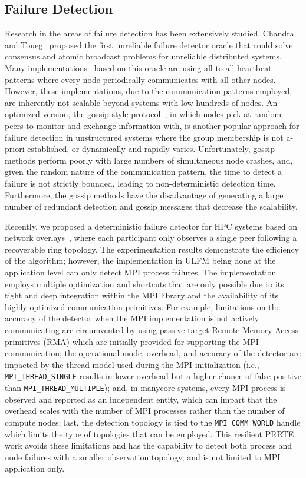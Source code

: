 \documentclass[sigconf]{acmart}
\newcommand{\mpifunc}[1]{\lstinline"MPI_#1"\xspace}
\newcommand{\prrte}[0]{\textsc{PRRTE}\xspace}
\newcommand{\ulfm}[0]{\textsc{ULFM}\xspace}
\newcommand{\mpi}[0]{\textsc{MPI}\xspace}
\begin{document}
\subsection{Failure Detection}
Research in the areas of failure detection has been extensively studied. Chandra and Toueg~\cite{Chandra96} proposed the first unreliable failure detector oracle that could solve consensus and atomic broadcast problems for unreliable distributed systems. Many implementations~\cite{Wei02, Larrea00, Kawazoe97} based on this oracle are using all-to-all heartbeat patterns where every node periodically communicates with all other nodes. However, these implementations, due to the communication patterns employed, are inherently not scalable beyond  systems with low hundreds of nodes. An optimized version, the gossip-style protocol~\cite{van98, Ranganathan01, Gupta01, Abhinandan02}, in which nodes pick at random peers to monitor and exchange information with, is another popular approach for failure detection in unstructured systems where the group membership is not a-priori established, or dynamically and rapidly varies. Unfortunately, gossip methods perform poorly with large numbers of simultaneous node crashes, and, given the random nature of the communication pattern, the time to detect a failure is not strictly bounded, leading to non-deterministic detection time. Furthermore, the gossip methods have the disadvantage of generating a large number of redundant detection and gossip messages that decrease the scalability.

Recently, we proposed a deterministic failure detector for HPC systems based on network overlays~\cite{George16}, where each participant only observes a single peer following a recoverable ring topology.
The experimentation results demonstrate the efficiency of the algorithm; however, the implementation in \ulfm being done at the application level can only detect \mpi process failures. The
implementation employs multiple optimization and shortcuts that are only possible due to 
its tight and deep integration within the \mpi library and the availability of
 its highly optimized communication primitives. For example, limitations on the
accuracy of the detector when the \mpi implementation is not actively communicating
are circumvented by using passive target Remote Memory Access primitives (RMA) which are
initially provided for supporting the \mpi communication; the operational
mode, overhead, and accuracy of the detector are impacted by the thread model used
during the \mpi initialization (i.e., \mpifunc{THREAD_SINGLE} results
in lower overhead but a higher chance of false positive than \mpifunc{THREAD_MULTIPLE});
and, in manycore systems, every \mpi process
is observed and reported as an independent entity, which can impart that the
overhead scales with the number of \mpi processes rather than the number of
compute nodes; last, the detection topology is tied to the \mpifunc{COMM_WORLD} 
handle which limits the type of topologies that can be employed. 
This resilient \prrte work
avoids these limitations and has the capability to detect both process and
node failures with a smaller observation topology, and is not limited to
MPI application only.
\end{document}
